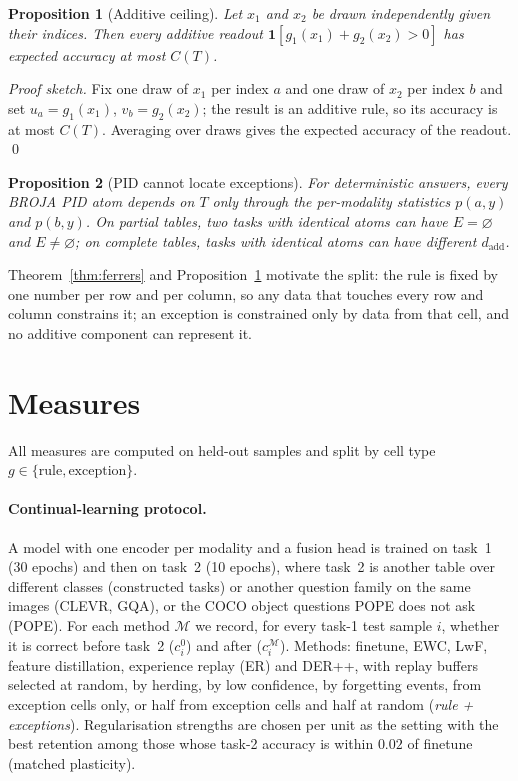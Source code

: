 \documentclass[11pt]{article}
\newtheorem{proposition}{Proposition}
\newcommand{\1}{\mathbf{1}}
\begin{document}
\begin{proposition}[Additive ceiling]\label{prop:ceiling}
Let $x_1$ and $x_2$ be drawn independently given their indices. Then every additive readout
$\1[g_1(x_1)+g_2(x_2)>0]$ has expected accuracy at most $C(T)$.
\end{proposition}
\noindent\emph{Proof sketch.} Fix one draw of $x_1$ per index $a$ and one draw of $x_2$ per index $b$ and set
$u_a=g_1(x_1)$, $v_b=g_2(x_2)$; the result is an additive rule, so its accuracy is at most $C(T)$. Averaging over draws
gives the expected accuracy of the readout. \qed

\begin{proposition}[PID cannot locate exceptions]\label{prop:pid}
For deterministic answers, every BROJA PID atom depends on $T$ only through the per-modality statistics
$p(a,y)$ and $p(b,y)$. On partial tables, two tasks with identical atoms can have $E=\varnothing$ and $E\neq\varnothing$;
on complete tables, tasks with identical atoms can have different $d_{\mathrm{add}}$.
\end{proposition}
\noindent
Theorem~\ref{thm:ferrers} and Proposition~\ref{prop:ceiling} motivate the split: the rule is fixed by one number per
row and per column, so any data that touches every row and column constrains it; an exception is constrained only by
data from that cell, and no additive component can represent it.

\section{Measures}\label{sec:measures}

All measures are computed on held-out samples and split by cell type $g\in\{\text{rule},\text{exception}\}$.

\paragraph{Continual-learning protocol.} A model with one encoder per modality and a fusion head is trained on task~1
(30 epochs) and then on task~2 (10 epochs), where task~2 is another table over different classes (constructed tasks)
or another question family on the same images (CLEVR, GQA), or the COCO object questions POPE does not ask (POPE). For each method $\mathcal{M}$ we record, for every task-1 test
sample $i$, whether it is correct before task~2 ($c_i^0$) and after ($c_i^{\mathcal{M}}$). Methods: finetune, EWC,
LwF, feature distillation, experience replay (ER) and DER++, with replay buffers selected at random, by herding, by low
confidence, by forgetting events, from exception cells only, or half from exception cells and half at random
(\emph{rule + exceptions}). Regularisation strengths are chosen per unit as the setting with the best retention among
those whose task-2 accuracy is within $0.02$ of finetune (matched plasticity).
\end{document}
